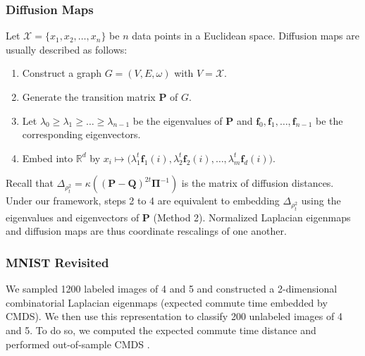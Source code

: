 \documentclass[professionalfonts, hyperref={pdfpagelabels=false,
  colorlinks=true, linkcolor=purple}]{beamer}
\begin{document}
\begin{frame}[label=diffusion_maps]
  \frametitle{Diffusion Maps}
    Let $\mathcal{X} = \{x_1,x_2,\dots,x_n\}$ be $n$ data points in a
    Euclidean space. Diffusion maps
    \cite{coifman06:_diffus_maps} are usually described as follows:
    \vskip10pt
  \begin{enumerate}
  \item Construct a graph $G = (V,E,\omega)$ with $V =
    \mathcal{X}$.
  \item Generate the transition matrix $\bm{P}$ of $G$.
  \item Let $\lambda_0 \geq \lambda_1 \geq \dots
    \geq \lambda_{n-1}$ be the eigenvalues of $\mathbf{P}$ and $\bm{f}_0, \bm{f}_1,
    \dots, \bm{f}_{n-1}$ be the corresponding eigenvectors.
  \item Embed into $\mathbb{R}^{d}$ by $x_i \mapsto \bigl(
    \lambda_{1}^{t} \bm{f}_{1}(i), \lambda_{2}^{t} \bm{f}_{2}(i),
    \dots, \lambda_{m}^{t} \bm{f}_{d}(i))$.
  \end{enumerate}
  \begin{alertblock}{}
    Recall that $\Delta_{\rho_t^2} = \kappa((\mathbf{P} -
    \mathbf{Q})^{2t}\bm{\Pi}^{-1})$ is the matrix of diffusion
    distances. Under our framework, steps 2 to 4 are equivalent to
    embedding $\Delta_{\rho_{t}^2}$ using the eigenvalues and
    eigenvectors of $\mathbf{P}$ (Method 2). Normalized Laplacian eigenmaps and
    diffusion maps are thus coordinate rescalings of one another.
  \end{alertblock}
\end{frame}

\begin{frame}[label=out_of_sample_mnist]
  \frametitle{MNIST Revisited}
  We sampled 1200 labeled images of 4 and 5
  and constructed a 2-dimensional combinatorial Laplacian eigenmaps
  (expected commute time embedded by CMDS). We then use this
  representation to classify 200 unlabeled images of 4 and 5. To do
  so, we computed the expected commute time distance and performed
  out-of-sample CMDS \cite{trosset08}.
  \begin{figure}[htbp]
    \begin{center}
      \hyperlink{fig:out_of_sample_mnist}{}
    \end{center}
  \end{figure}    
\end{frame}
\end{document}
